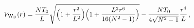 \begin{equation}
\label{potmicdual}
V_{\rm W_B}(r)=\frac{NT_0}{L} \sqrt{\Bigl(1+\frac{r^2}{L^2}\Bigr)
\Bigl(1+\frac{L^2r^6}{16(N^2-1)}\Bigr)}-\frac{NT_0}{4\sqrt{N^2-1}}
\frac{r^4}{L}\, ,
\end{equation}

